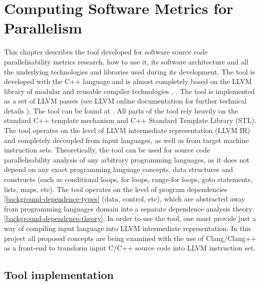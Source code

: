\chapter{Computing Software Metrics for Parallelism} \label{ppar-tool}
\qquad This chapter describes the tool developed for software source code parallelisability metrics research, how to use it, its software architecture and all the underlying technologies and libraries used during its development.\newline
\null\qquad The tool is developed with the C++ language and is almost completely based on the \textsc{LLVM} library of modular and reusable compiler technologies \cite{llvm-paper}, \cite{llvm-official-website}. The tool is implemented as a set of LLVM passes (see LLVM online documentation for further technical details \cite{llvm-online-docs}). The tool can be found at \cite{ppar-tool}. All parts of the tool rely heavily on the standard C++ template mechanism and C++ Standard Template Library (STL).\newline 
\null\qquad The tool operates on the level of LLVM intermediate representation \cite{llvm-online-docs-ir} (LLVM IR) and completely decoupled from input languages, as well as from target machine instruction sets. Theoretically, the tool can be used for source code parallelisability analysis of any arbitrary programming languages, as it does not depend on any exact programming language concepts, data structures and constructs (such as conditional loops, for loops, range-for loops, goto statements, lists, maps, etc). The tool operates on the level of program dependencies \ref{background-dependence-types} (data, control, etc), which are abstracted away from programming languages domain into a separate dependence analysis theory \ref{background-dependence-theory}. In order to use the tool, one must provide just a way of compiling input language into LLVM intermediate representation.\newline 
\null\qquad In this project all proposed concepts are being examined with the use of Clang/Clang++ as a front-end to transform input C/C++ source code into LLVM instruction set.\newline

\section{Tool implementation} 
\label{ppar-tool-implementation}

